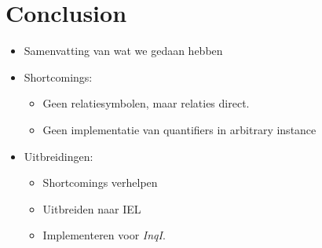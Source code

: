 \section{Conclusion}\label{sec:Conclusion}
\begin{itemize}
    \item Samenvatting van wat we gedaan hebben
    \item Shortcomings:
        \begin{itemize}
            \item Geen relatiesymbolen, maar relaties direct.
            \item Geen implementatie van quantifiers in arbitrary instance
        \end{itemize}
    \item Uitbreidingen:
        \begin{itemize}
            \item Shortcomings verhelpen
            \item Uitbreiden naar IEL
            \item Implementeren voor \textit{InqI}.
        \end{itemize}
\end{itemize}
